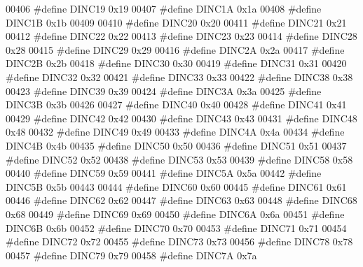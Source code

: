 \begin{DoxyCode}
00406 \textcolor{preprocessor}{#define DINC19 0x19}
00407 \textcolor{preprocessor}{#define DINC1A 0x1a}
00408 \textcolor{preprocessor}{#define DINC1B 0x1b}
00409 
00410 \textcolor{preprocessor}{#define DINC20 0x20}
00411 \textcolor{preprocessor}{#define DINC21 0x21}
00412 \textcolor{preprocessor}{#define DINC22 0x22}
00413 \textcolor{preprocessor}{#define DINC23 0x23}
00414 \textcolor{preprocessor}{#define DINC28 0x28}
00415 \textcolor{preprocessor}{#define DINC29 0x29}
00416 \textcolor{preprocessor}{#define DINC2A 0x2a}
00417 \textcolor{preprocessor}{#define DINC2B 0x2b}
00418 \textcolor{preprocessor}{#define DINC30 0x30}
00419 \textcolor{preprocessor}{#define DINC31 0x31}
00420 \textcolor{preprocessor}{#define DINC32 0x32}
00421 \textcolor{preprocessor}{#define DINC33 0x33}
00422 \textcolor{preprocessor}{#define DINC38 0x38}
00423 \textcolor{preprocessor}{#define DINC39 0x39}
00424 \textcolor{preprocessor}{#define DINC3A 0x3a}
00425 \textcolor{preprocessor}{#define DINC3B 0x3b}
00426 
00427 \textcolor{preprocessor}{#define DINC40 0x40}
00428 \textcolor{preprocessor}{#define DINC41 0x41}
00429 \textcolor{preprocessor}{#define DINC42 0x42}
00430 \textcolor{preprocessor}{#define DINC43 0x43}
00431 \textcolor{preprocessor}{#define DINC48 0x48}
00432 \textcolor{preprocessor}{#define DINC49 0x49}
00433 \textcolor{preprocessor}{#define DINC4A 0x4a}
00434 \textcolor{preprocessor}{#define DINC4B 0x4b}
00435 \textcolor{preprocessor}{#define DINC50 0x50}
00436 \textcolor{preprocessor}{#define DINC51 0x51}
00437 \textcolor{preprocessor}{#define DINC52 0x52}
00438 \textcolor{preprocessor}{#define DINC53 0x53}
00439 \textcolor{preprocessor}{#define DINC58 0x58}
00440 \textcolor{preprocessor}{#define DINC59 0x59}
00441 \textcolor{preprocessor}{#define DINC5A 0x5a}
00442 \textcolor{preprocessor}{#define DINC5B 0x5b}
00443 
00444 \textcolor{preprocessor}{#define DINC60 0x60}
00445 \textcolor{preprocessor}{#define DINC61 0x61}
00446 \textcolor{preprocessor}{#define DINC62 0x62}
00447 \textcolor{preprocessor}{#define DINC63 0x63}
00448 \textcolor{preprocessor}{#define DINC68 0x68}
00449 \textcolor{preprocessor}{#define DINC69 0x69}
00450 \textcolor{preprocessor}{#define DINC6A 0x6a}
00451 \textcolor{preprocessor}{#define DINC6B 0x6b}
00452 \textcolor{preprocessor}{#define DINC70 0x70}
00453 \textcolor{preprocessor}{#define DINC71 0x71}
00454 \textcolor{preprocessor}{#define DINC72 0x72}
00455 \textcolor{preprocessor}{#define DINC73 0x73}
00456 \textcolor{preprocessor}{#define DINC78 0x78}
00457 \textcolor{preprocessor}{#define DINC79 0x79}
00458 \textcolor{preprocessor}{#define DINC7A 0x7a}

\end{DoxyCode}
